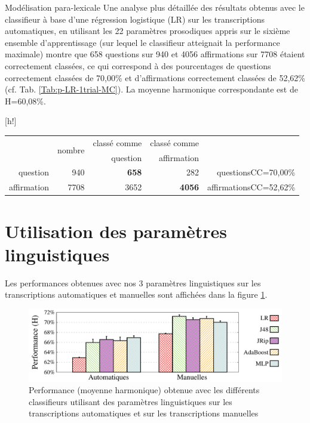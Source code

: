 \documentclass{style/these}
\makeatletter
\renewcommand\familydefault{ptm}
\renewenvironment{table}%
{ \renewcommand{\familydefault}{ptm}\selectfont
  \@float{table}}
  {\end@float}
\makeatother
\begin{document}
\begin{part}{Modélisation para-lexicale}
Une analyse plus détaillée des résultats obtenus avec le classifieur à base d'une régression logistique (LR) sur les transcriptions automatiques, en utilisant les 22 paramètres prosodiques appris sur le sixième ensemble d'apprentissage (sur lequel le classifieur atteignait la performance maximale) montre que 658 questions sur 940 et 4056 affirmations sur 7708 étaient correctement classées, ce qui correspond à des pourcentages de questions correctement classées de 70,00\% et d'affirmations correctement classées de 52,62\% (cf. Tab. \ref{Tab:p-LR-1trial-MC}). 
La moyenne harmonique correspondante est de H=60,08\%. 

\begin{table}[h!]
\centering
\begin{tabular}{|r|r|r|r|r}
\cline{2-4}
\multicolumn{1}{c|}{} 	& \multirow{2}{*}{nombre}	& classé comme 	& classé comme 	& 				\\ 
\multicolumn{1}{c|}{} 	& 				& question 	& affirmation 	& 				\\ \cline{1-4} 
question		&   940				& \textbf{658}	& 282		& questionsCC=70,00\%		\\ \cline{1-4} 
affirmation		&  7708				&  3652		& \textbf{4056}	& affirmationsCC=52,62\%	\\ \cline{1-4}	
\end{tabular}
\caption{Matrice de confusion question/affirmation obtenue avec le classifieur LR sur 22 paramètres prosodiques ('phraseComplète') extraits des transcriptions automatiques}
\label{Tab:p-LR-1trial-MC}
\end{table}


\section{Utilisation des paramètres linguistiques}
\label{sec:ling}
\renewcommand{\rightmark}{Utilisation des paramètres linguistiques}

Les performances obtenues avec nos 3 paramètres linguistiques sur les  transcriptions automatiques et manuelles sont affichées dans la figure \ref{Fig:QD-L-MvsA}. 

\begin{figure}[h!]
\centering
\includegraphics[scale=0.56]{images/results/linguisticClassifier_compareManualVsAutomatic.pdf}
\caption{Performance (moyenne harmonique) obtenue avec les différents classifieurs utilisant des paramètres linguistiques sur les transcriptions automatiques et sur les transcriptions manuelles}
\label{Fig:QD-L-MvsA}
\end{figure}


\end{part}
\end{document}
